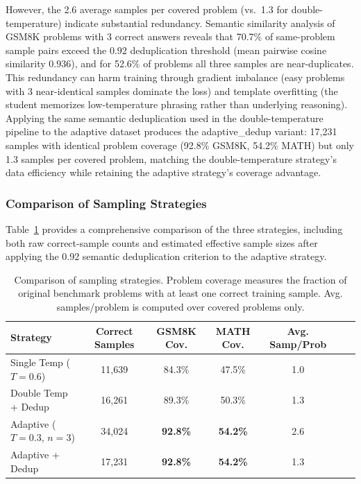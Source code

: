 \documentclass{article}
\begin{document}
However, the 2.6 average samples per covered problem (vs.\ 1.3 for double-temperature) indicate substantial redundancy. Semantic similarity analysis of GSM8K problems with 3 correct answers reveals that 70.7\% of same-problem sample pairs exceed the $0.92$ deduplication threshold (mean pairwise cosine similarity $\mathbf{0.936}$), and for 52.6\% of problems all three samples are near-duplicates. This redundancy can harm training through gradient imbalance (easy problems with 3 near-identical samples dominate the loss) and template overfitting (the student memorizes low-temperature phrasing rather than underlying reasoning). Applying the same semantic deduplication used in the double-temperature pipeline to the adaptive dataset produces the adaptive\_dedup variant: 17,231 samples with identical problem coverage (92.8\% GSM8K, 54.2\% MATH) but only 1.3 samples per covered problem, matching the double-temperature strategy's data efficiency while retaining the adaptive strategy's coverage advantage.

\subsubsection{Comparison of Sampling Strategies}

Table~\ref{tab:comparison} provides a comprehensive comparison of the three strategies, including both raw correct-sample counts and estimated effective sample sizes after applying the 0.92 semantic deduplication criterion to the adaptive strategy.

\begin{table}[H]
\centering
\caption{Comparison of sampling strategies. Problem coverage measures the fraction of original benchmark problems with at least one correct training sample. Avg. samples/problem is computed over covered problems only.}
\label{tab:comparison}
\begin{tabular}{lcccccc}
\toprule
\textbf{Strategy} & \textbf{Correct Samples} & \textbf{GSM8K Cov.} & \textbf{MATH Cov.} & \textbf{Avg. Samp/Prob} \\
\midrule
Single Temp ($T = 0.6$)      & 11,639 & 84.3\% & 47.5\% & 1.0 \\
Double Temp + Dedup           & 16,261 & 89.3\% & 50.3\% & 1.3 \\
Adaptive ($T = 0.3$, $n = 3$) & 34,024 & \textbf{92.8\%} & \textbf{54.2\%} & 2.6 \\
Adaptive + Dedup              & 17,231 & \textbf{92.8\%} & \textbf{54.2\%} & 1.3 \\
\bottomrule
\end{tabular}
\end{table}
\end{document}
